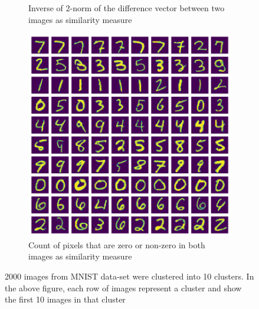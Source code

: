 \documentclass[10pt,a4paper, nocenter]{report}
\begin{document}
\begin{enumerate}
\begin{figure}[h]
\begin{center}
\begin{subfigure}[b]{0.3\textwidth}
                    \caption{Inverse of 2-norm of the difference vector between two images as similarity measure}
                    \label{fig:clustering_10_2norm}
                \end{subfigure}           
                \begin{subfigure}[b]{0.3\textwidth}
                    \centering
                    \includegraphics[width=\textwidth]{../../images/number_clustering_10_hamming.png}
                    \caption{Count of pixels that are zero or non-zero in both images as similarity measure}
                    \label{fig:clustering_10_hamming}
                \end{subfigure}           
            \end{center}
            \caption{2000 images from MNIST data-set were clustered into 10 clusters. In the above figure, each row of images represent a cluster and show the first 10 images in that cluster}
            \label{fig:mnist10ClusterImages}
        \end{figure}


\end{enumerate}
\end{document}
